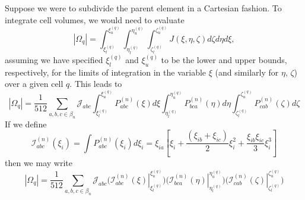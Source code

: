 \documentclass[11pt]{article} %
\begin{document}
Suppose we were to subdivide the parent element in a Cartesian fashion. To integrate cell volumes, we would need to evaluate
\begin{equation}
	| \Omega_q | = \int_{\xi^{(q)}_{l}}^{\xi^{(q)}_{u}} \int_{\eta^{(q)}_{l}}^{\eta^{(q)}_{u}} \int_{\zeta^{(q)}_{l}}^{\zeta^{(q)}_{u}} J (\xi, \eta, \zeta) d \zeta d \eta d \xi,
\end{equation}
assuming we have specified $\xi^{(q)}_l$ and $\xi^{(q)}_u$ to be the lower and upper bounds, respectively, for the limits of integration in the variable $\xi$ (and similarly for $\eta$, $\zeta$) over a given cell $q$. This leads to
\begin{equation}
	| \Omega_q | = \frac{1}{512} \sum_{a,b,c \in \beta_n} \mathcal{J}_{abc} \int_{\xi^{(q)}_{l}}^{\xi^{(q)}_{u}} P^{(n)}_{abc} (\xi) d \xi \int_{\eta^{(q)}_{l}}^{\eta^{(q)}_{u}} P^{(n)}_{bca} (\eta) d \eta \int_{\zeta^{(q)}_{l}}^{\zeta^{(q)}_{u}} P^{(n)}_{cab} (\zeta) d \zeta
\end{equation}
If we define
\begin{equation}
	\mathcal{I}^{(n)}_{abc} (\xi_i) = \int P^{(n)}_{abc} (\xi_i) d \xi_i = \xi_{ia} \left[\xi_i + \frac{(\xi_{ib} + \xi_{ic})}{2} \xi_i^2 + \frac{\xi_{ib} \xi_{ic}}{3} \xi_i^3 \right]
\end{equation}
then we may write
\begin{equation}
	| \Omega_q | = \frac{1}{512} \sum_{a,b,c \in \beta_n} \mathcal{J}_{abc} \bigg( \left. \mathcal{I}^{(n)}_{abc} (\xi) \right|^{\xi^{(q)}_{u}}_{\xi^{(q)}_{l}} \bigg) \bigg( \left. \mathcal{I}^{(n)}_{bca} (\eta) \right|^{\eta^{(q)}_{u}}_{\eta^{(q)}_{l}} \bigg) \bigg( \left. \mathcal{I}^{(n)}_{cab} (\zeta) \right|^{\zeta^{(q)}_{u}}_{\zeta^{(q)}_{l}} \bigg)
\end{equation}
\end{document}
